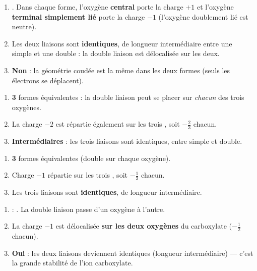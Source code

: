 \documentclass[11pt,a4paper]{article}
\begin{document}
\begin{corrige}[l'ozone \ce{O3}]
\begin{enumerate}[label=\alph*)]
  \item {}. Dans chaque forme, l'oxygène \textbf{central} porte la charge $+1$
        et l'oxygène \textbf{terminal simplement lié} porte la charge $-1$ (l'oxygène doublement
        lié est neutre).
  \item Les deux liaisons  sont \textbf{identiques}, de longueur intermédiaire entre une
        simple et une double : la double liaison est délocalisée sur les deux.
  \item \textbf{Non} : la géométrie coudée est la même dans les deux formes (seuls les électrons
        se déplacent).
\end{enumerate}
\end{corrige}

\begin{corrige}
\begin{enumerate}[label=\alph*)]
  \item \textbf{3} formes équivalentes : la double liaison  peut se placer sur \emph{chacun}
        des trois oxygènes.
  \item La charge $-2$ est répartie également sur les trois , soit $-\tfrac{2}{3}$ chacun.
  \item \textbf{Intermédiaires} : les trois liaisons  sont identiques, entre simple et double.
\end{enumerate}
\end{corrige}

\begin{corrige}
\begin{enumerate}[label=\alph*)]
  \item \textbf{3} formes équivalentes (double  sur chaque oxygène).
  \item Charge $-1$ répartie sur les trois , soit $-\tfrac{1}{3}$ chacun.
  \item Les trois liaisons  sont \textbf{identiques}, de longueur intermédiaire.
\end{enumerate}
\end{corrige}

\begin{corrige}
\begin{enumerate}[label=\alph*)]
  \item {} : . La double liaison  passe
        d'un oxygène à l'autre.
  \item La charge $-1$ est délocalisée \textbf{sur les deux oxygènes} du carboxylate
        ($-\tfrac{1}{2}$ chacun).
  \item \textbf{Oui} : les deux liaisons  deviennent identiques (longueur intermédiaire) —
        c'est la grande stabilité de l'ion carboxylate.
\end{enumerate}
\end{corrige}
\end{document}
